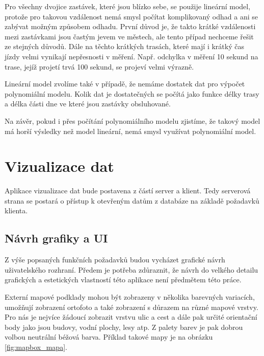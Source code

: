 \bigbreak


Pro všechny dvojice zastávek, které jsou blízko sebe, se použije lineární model, protože pro takovou vzdálenost nemá smysl počítat komplikovaný odhad a ani se zabývat možným způsobem odhadu. První důvod je, že takto krátké vzdálenosti mezi zastávkami jsou častým jevem ve městech, ale tento případ nechceme řešit ze stejných důvodů. Dále na těchto krátkých trasách, které mají i krátký čas jízdy velmi vynikají nepřesnosti v měření. Např. odchylka v měření 10 sekund na trase, jejíž projetí trvá 100 sekund, se projeví velmi výrazně.


\bigbreak


Lineární model zvolíme také v případě, že nemáme dostatek dat pro výpočet polynomiální modelu. Kolik dat je dostatečných se počítá jako funkce délky trasy a délka části dne ve které jsou zastávky obsluhované.


\bigbreak


Na závěr, pokud i přes počítání polynomiálního modelu zjistíme, že takový model má horší výsledky než model lineární, nemá smysl využívat polynomiální model.


\section{Vizualizace dat} \label{section:navrh_vizualizace}


 Aplikace vizualizace dat bude postavena z částí server a klient. Tedy serverová strana se postará o přístup k otevřeným datům z databáze na základě požadavků klienta.


\subsection{Návrh grafiky a UI}


Z výše popsaných funkčních požadavků budou vycházet grafické návrh uživatelského rozhraní. Předem je potřeba zdůraznit, že návrh do velkého detailu grafických a estetických vlastností této aplikace není předmětem této práce.


\bigbreak


Externí mapové podklady mohou být zobrazeny v několika barevných variacích, umožňují zobrazení ortofoto a také zobrazení s důrazem na různé mapové vrstvy. Pro nás je nejvíce žádoucí zobrazit vrstvu ulic a cest a dále pak určité orientační body jako jsou budovy, vodní plochy, lesy atp. Z palety barev je pak dobrou volbou neutrální béžová barva. Příklad takové mapy je na obrázku \ref{fig:mapbox_mapa}.



